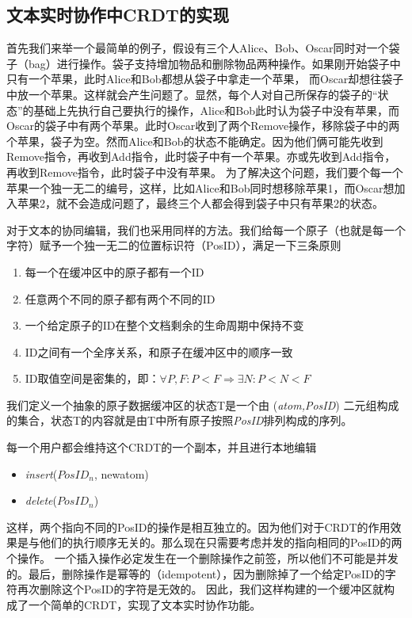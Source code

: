 \documentclass[11pt]{ctexart}
\begin{document}
\subsection{文本实时协作中CRDT的实现}
首先我们来举一个最简单的例子，假设有三个人Alice、Bob、Oscar同时对一个袋子（bag）进行操作。袋子支持增加物品和删除物品两种操作。如果刚开始袋子中只有一个苹果，此时Alice和Bob都想从袋子中拿走一个苹果，
而Oscar却想往袋子中放一个苹果。这样就会产生问题了。显然，每个人对自己所保存的袋子的“状态”的基础上先执行自己要执行的操作，Alice和Bob此时认为袋子中没有苹果，而Oscar的袋子中有两个苹果。此时Oscar收到了两个Remove操作，移除袋子中的两个苹果，袋子为空。然而Alice和Bob的状态不能确定。因为他们俩可能先收到Remove指令，再收到Add指令，此时袋子中有一个苹果。亦或先收到Add指令，再收到Remove指令，此时袋子中没有苹果。
为了解决这个问题，我们要个每一个苹果一个独一无二的编号，这样，比如Alice和Bob同时想移除苹果1，而Oscar想加入苹果2，就不会造成问题了，最终三个人都会得到袋子中只有苹果2的状态。

对于文本的协同编辑，我们也采用同样的方法。我们给每一个原子（也就是每一个字符）赋予一个独一无二的位置标识符（PosID），满足一下三条原则
\begin{enumerate}
	\item 每一个在缓冲区中的原子都有一个ID
	\item 任意两个不同的原子都有两个不同的ID
	\item 一个给定原子的ID在整个文档剩余的生命周期中保持不变
	\item ID之间有一个全序关系，和原子在缓冲区中的顺序一致
	\item ID取值空间是密集的，即：$\forall P, F : P < F \Rightarrow \exists N: P < N < F$
\end{enumerate}
我们定义一个抽象的原子数据缓冲区的状态T是一个由 (\textit{atom,PosID}) 二元组构成的集合，状态T的内容就是由T中所有原子按照\textit{PosID}排列构成的序列。 

每一个用户都会维持这个CRDT的一个副本，并且进行本地编辑
\begin{itemize}
	\item \textit{insert}($\mathit{PosID_{n}}$, newatom)
	\item \textit{delete}($\mathit{PosID_{n}}$)
\end{itemize}
这样，两个指向不同的PosID的操作是相互独立的。因为他们对于CRDT的作用效果是与他们的执行顺序无关的。那么现在只需要考虑并发的指向相同的PosID的两个操作。
一个插入操作必定发生在一个删除操作之前签，所以他们不可能是并发的。最后，删除操作是幂等的（idempotent），因为删除掉了一个给定PosID的字符再次删除这个PosID的字符是无效的。
因此，我们这样构建的一个缓冲区就构成了一个简单的CRDT，实现了文本实时协作功能。
\end{document}
